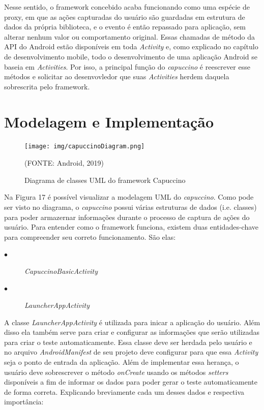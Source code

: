 \documentclass[
    12pt,       %
    openright,      %
    twoside,      %
    a4paper,      %
    english,      %
    french,       %
    spanish,      %
    brazil,       %
    ]{abntex2}
\begin{document}
        Nesse sentido, o framework concebido acaba funcionando como uma espécie de proxy, em que as
        ações capturadas do usuário são guardadas em estrutura de dados da própria biblioteca, e o
        evento é então repassado para aplicação, sem alterar nenhum valor ou comportamento
        original. Essas chamadas de método da API do Android estão disponíveis em toda \textit{Activity}
        e, como explicado no capítulo de desenvolvimento mobile, todo o desenvolvimento de uma aplicação
        Android se baseia em \textit{Activities}. Por isso, a principal função do \textit{capuccino} é
        reescrever esse métodos e solicitar ao desenvovledor que suas \textit{Activities} herdem daquela
        sobrescrita pelo framework.

        \section{Modelagem e Implementação}
          \begin{figure}
              \begin{center}
                \texttt{[image: img/capuccinoDiagram.png]}
                \caption{Diagrama de classes UML do framework Capuccino}
                \label{fig:PropProf}
                \begin{center}(FONTE: Android, 2019)\end{center}
              \end{center}
          \end{figure}

          Na Figura 17 é possível visualizar a modelagem UML do \textit{capuccino}. Como pode ser
          visto no diagrama, o \textit{capuccino} possui várias estruturas de dados (i.e. classes)
          para poder armazernar informações durante o processo de captura de ações do usuário.
          Para entender como o framework funciona, existem duas entidades-chave para compreender
          seu correto funcionamento. São elas:

          \begin{description}
            \item[$\bullet$] \textit{CapuccinoBasicActivity}
            \item[$\bullet$] \textit{LauncherAppActivity}
          \end{description}

          A classe \textit{LauncherAppActivity} é utilizada para inicar a aplicação do usuário. Além
          disso ela também serve para criar e configurar as informações que serão utilizadas para criar
          o teste automaticamente. Essa classe deve ser herdada pelo usuário e no arquivo \textit{AndroidManifest}
          de seu projeto deve configurar para que essa \textit{Activity} seja o ponto
          de entrada da aplicação. Além de implementar essa herança, o usuário deve sobrescrever o
          método \textit{onCreate} usando os métodos \textit{setters} disponíveis a fim de informar os dados
          para poder gerar o teste automaticamente de forma correta. Explicando breviamente cada um
          desses dados e respectiva importância:
\end{document}
